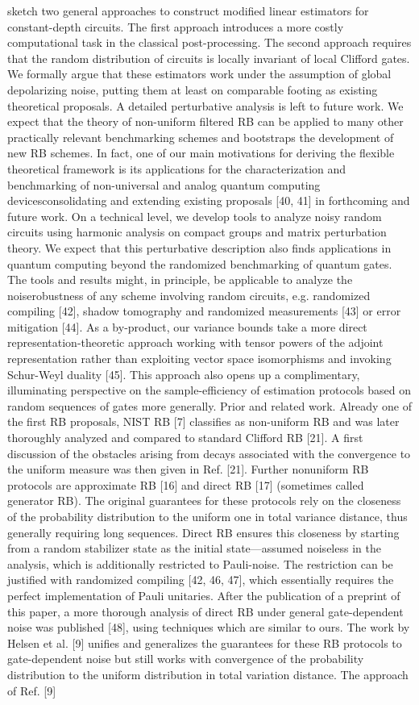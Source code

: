 sketch two general approaches to construct modified linear estimators for constant-depth circuits. The first approach introduces a more costly computational task in the classical post-processing. The second approach requires that the random distribution of circuits is locally invariant of local Clifford gates. We formally argue that these estimators work under the assumption of global depolarizing noise, putting them at least on comparable footing as existing theoretical proposals. A detailed perturbative analysis is left to future work. We expect that the theory of non-uniform filtered RB can be applied to many other practically relevant benchmarking schemes and bootstraps the development of new RB schemes. In fact, one of our main motivations for deriving the flexible theoretical framework is its applications for the characterization and benchmarking of non-universal and analog quantum computing devicesconsolidating and extending existing proposals [40, 41] in forthcoming and future work. On a technical level, we develop tools to analyze noisy random circuits using harmonic analysis on compact groups and matrix perturbation theory. We expect that this perturbative description also finds applications in quantum computing beyond the randomized benchmarking of quantum gates. The tools and results might, in principle, be applicable to analyze the noiserobustness of any scheme involving random circuits, e.g. randomized compiling [42], shadow tomography and randomized measurements [43] or error mitigation [44]. As a by-product, our variance bounds take a more direct representation-theoretic approach working with tensor powers of the adjoint representation rather than exploiting vector space isomorphisms and invoking Schur-Weyl duality [45]. This approach also opens up a complimentary, illuminating perspective on the sample-efficiency of estimation protocols based on random sequences of gates more generally. Prior and related work. Already one of the first RB proposals, NIST RB [7] classifies as non-uniform RB and was later thoroughly analyzed and compared to standard Clifford RB [21]. A first discussion of the obstacles arising from decays associated with the convergence to the uniform measure was then given in Ref. [21]. Further nonuniform RB protocols are approximate RB [16] and direct RB [17] (sometimes called generator RB). The original guarantees for these protocols rely on the closeness of the probability distribution to the uniform one in total variance distance, thus generally requiring long sequences. Direct RB ensures this closeness by starting from a random stabilizer state as the initial state—assumed noiseless in the analysis, which is additionally restricted to Pauli-noise. The restriction can be justified with randomized compiling [42, 46, 47], which essentially requires the perfect implementation of Pauli unitaries. After the publication of a preprint of this paper, a more thorough analysis of direct RB under general gate-dependent noise was published [48], using techniques which are similar to ours. The work by Helsen et al. [9] unifies and generalizes the guarantees for these RB protocols to gate-dependent noise but still works with convergence of the probability distribution to the uniform distribution in total variation distance. The approach of Ref. [9] 